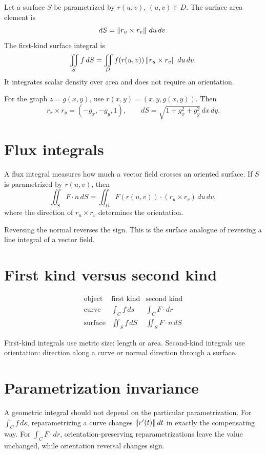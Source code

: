 Let a surface \(S\) be parametrized by \(r(u,v)\), \((u,v)\in D\).  The surface area element is
\[
  dS=\left\lVert r_u\times r_v \right\rVert\,du\,dv.
\]
The first-kind surface integral is
\[
  \iint_S f\,dS
  =\iint_D f(r(u,v))\left\lVert r_u\times r_v \right\rVert\,du\,dv.
\]
It integrates scalar density over area and does not require an orientation.

\begin{example}
For the graph \(z=g(x,y)\), use \(r(x,y)=(x,y,g(x,y))\).  Then
\[
  r_x\times r_y=(-g_x,-g_y,1),\qquad
  dS=\sqrt{1+g_x^2+g_y^2}\,dx\,dy.
\]
\end{example}

\section{Flux integrals}

A flux integral measures how much a vector field crosses an oriented surface.  If \(S\) is parametrized by \(r(u,v)\), then
\[
  \iint_S F\cdot n\,dS
  =\iint_D F(r(u,v))\cdot(r_u\times r_v)\,du\,dv,
\]
where the direction of \(r_u\times r_v\) determines the orientation.

Reversing the normal reverses the sign.  This is the surface analogue of reversing a line integral of a vector field.

\section{First kind versus second kind}

\[
\begin{array}{c|c|c}
\text{object} & \text{first kind} & \text{second kind}\\
\hline
\text{curve} & \int_C f\,ds & \int_C F\cdot dr\\
\text{surface} & \iint_S f\,dS & \iint_S F\cdot n\,dS
\end{array}
\]

First-kind integrals use metric size: length or area.  Second-kind integrals use orientation: direction along a curve or normal direction through a surface.

\section{Parametrization invariance}

A geometric integral should not depend on the particular parametrization.  For \(\int_C f\,ds\), reparametrizing a curve changes \(\left\lVert r'(t) \right\rVert dt\) in exactly the compensating way.  For \(\int_C F\cdot dr\), orientation-preserving reparametrizations leave the value unchanged, while orientation reversal changes sign.

